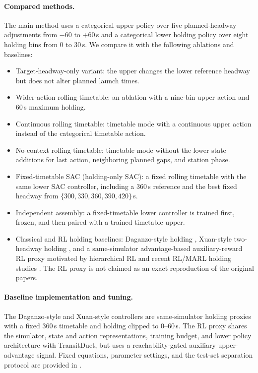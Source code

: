 \paragraph{Compared methods.}
The main method uses a categorical upper policy over five planned-headway adjustments from $-60$ to $+60$\,s and a categorical lower holding policy over eight holding bins from 0 to 30\,s. We compare it with the following ablations and baselines:
\begin{itemize}[leftmargin=*]
    \item Target-headway-only variant: the upper changes the lower reference headway but does not alter planned launch times.
    \item Wider-action rolling timetable: an ablation with a nine-bin upper action and 60\,s maximum holding.
    \item Continuous rolling timetable: timetable mode with a continuous upper action instead of the categorical timetable action.
    \item No-context rolling timetable: timetable mode without the lower state additions for last action, neighboring planned gaps, and station phase.
    \item Fixed-timetable SAC (holding-only SAC): a fixed rolling timetable with the same lower SAC controller, including a 360\,s reference and the best fixed headway from $\{300,330,360,390,420\}$\,s.
    \item Independent assembly: a fixed-timetable lower controller is trained first, frozen, and then paired with a trained timetable upper.
    \item Classical and RL holding baselines: Daganzo-style holding \citep{daganzo2009headway}, Xuan-style two-headway holding \citep{xuan2011dynamic}, and a same-simulator advantage-based auxiliary-reward RL proxy motivated by hierarchical RL and recent RL/MARL holding studies \citep{li2019hierarchical,singh2024piper,wang2021asynchronous,wang2023robust,yu2024hierarchical,xu2025systematic,li2026graphaware}. The RL proxy is not claimed as an exact reproduction of the original papers.
\end{itemize}

\paragraph{Baseline implementation and tuning.}
The Daganzo-style and Xuan-style controllers are same-simulator holding proxies with a fixed 360\,s timetable and holding clipped to 0--60\,s. The RL proxy shares the simulator, state and action representations, training budget, and lower policy architecture with TransitDuet, but uses a reachability-gated auxiliary upper-advantage signal. Fixed equations, parameter settings, and the test-set separation protocol are provided in .

